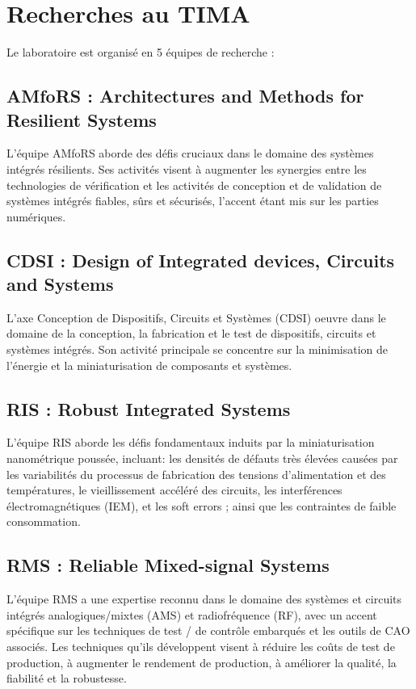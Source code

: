 \section{Recherches au TIMA}
Le laboratoire est organisé en 5 équipes de recherche :

\subsection[AMfoRS]{AMfoRS : Architectures and Methods for Resilient Systems}

L'équipe AMfoRS aborde des défis cruciaux dans le domaine des systèmes intégrés résilients.
Ses activités visent à augmenter les synergies entre les technologies de vérification 
et les activités de conception et de validation de systèmes intégrés fiables, sûrs et sécurisés, l'accent étant mis sur les parties numériques.

\subsection[CDSI]{CDSI : Design of Integrated devices, Circuits and Systems}

L'axe Conception de Dispositifs, Circuits et Systèmes (CDSI) oeuvre dans le domaine de la conception, 
la fabrication et le test de dispositifs, circuits et systèmes intégrés. 
Son activité principale se concentre sur la minimisation de l'énergie et la miniaturisation de composants et systèmes.

\subsection[RIS]{RIS : Robust Integrated Systems}

L'équipe RIS aborde les défis fondamentaux induits par la miniaturisation nanométrique poussée, 
incluant: les densités de défauts très élevées causées par les variabilités 
du processus de fabrication des tensions d’alimentation et des températures, le vieillissement accéléré des circuits, 
les interférences électromagnétiques (IEM), et les soft errors ; ainsi que les contraintes de faible consommation.

\subsection[RMS]{RMS : Reliable Mixed-signal Systems}

L'équipe RMS a une expertise reconnu dans le domaine des systèmes et circuits intégrés analogiques/mixtes (AMS) 
et radiofréquence (RF), avec un accent spécifique sur les techniques de test / de contrôle embarqués et les outils de CAO associés.
Les techniques qu'ils développent visent à réduire les coûts de test de production, 
à augmenter le rendement de production, à améliorer la qualité, la fiabilité et la robustesse.

